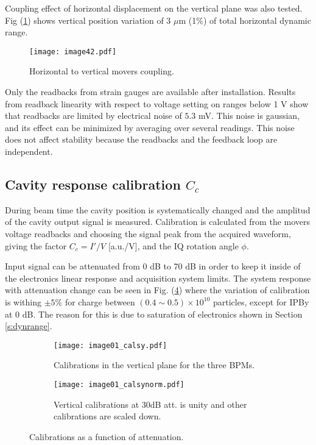 Coupling effect of horizontal displacement on the vertical plane was also tested. Fig (\ref{f:PIcoupling}) shows vertical position variation of 3 $\mu$m (1\%) of total horizontal dynamic range.\par
\begin{figure}[!htb]
\centering
\texttt{[image: image42.pdf]}\caption{Horizontal to vertical movers coupling.}\label{f:PIcoupling}
\end{figure}
Only the readbacks from strain gauges are available after installation. Results from readback linearity with respect to voltage setting on ranges below 1 V show that readbacks are limited by electrical noise of $5.3$ mV. This noise is gaussian, and its effect can be minimized by averaging over several readings. This noise does not affect stability because the readbacks and the feedback loop are independent.

\subsection{Cavity response calibration $C_c$}\label{s:calibration}
During beam time the cavity position is systematically changed and the amplitud of the cavity output signal is measured. Calibration is calculated from the movers voltage readbacks and choosing the signal peak from the acquired waveform,  giving the factor $C_c=I'/V$ [a.u./V], and the IQ rotation angle $\phi$.\par
Input signal can be attenuated from 0 dB to 70 dB in order to keep it inside of the electronics linear response and acquisition system limits. The system response with attenuation change can be seen in Fig. (\ref{f:calatt}) where the variation of calibration is withing $\pm5\%$ for charge between $(0.4\sim0.5)\times10^{10}$ particles, except for IPBy at 0 dB. The reason for this is due to saturation of electronics shown in Section \ref{s:dynrange}.
\begin{figure}[!htb]
 \centering\hspace*{-0.6cm}
 \begin{subfigure}{0.4\textwidth}
  \texttt{[image: image01\_calsy.pdf]}\caption{Calibrations in the vertical plane for the three BPMs.}\label{f:calsy}
 \end{subfigure}\hspace*{1cm}
\begin{subfigure}{0.4\textwidth}
  \texttt{[image: image01\_calsynorm.pdf]}\caption{Vertical calibrations at 30dB att. is unity and other calibrations are scaled down.}\label{f:calsynorm}
 \end{subfigure}\caption{Calibrations as a function of attenuation.}\label{f:calatt}
\end{figure}

